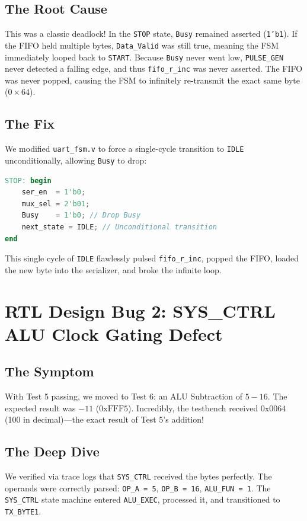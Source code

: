 \documentclass[11pt,a4paper]{article}
\begin{document}
\subsection{The Root Cause}
This was a classic deadlock! In the \texttt{STOP} state, \texttt{Busy} remained asserted (\texttt{1'b1}). If the FIFO held multiple bytes, \texttt{Data\_Valid} was still true, meaning the FSM immediately looped back to \texttt{START}. Because \texttt{Busy} never went low, \texttt{PULSE\_GEN} never detected a falling edge, and thus \texttt{fifo\_r\_inc} was never asserted. The FIFO was never popped, causing the FSM to infinitely re-transmit the exact same byte ($0\times64$).

\subsection{The Fix}
We modified \texttt{uart\_fsm.v} to force a single-cycle transition to \texttt{IDLE} unconditionally, allowing \texttt{Busy} to drop:
\begin{lstlisting}[language=Verilog]
STOP: begin
    ser_en  = 1'b0;
    mux_sel = 2'b01;
    Busy    = 1'b0; // Drop Busy
    next_state = IDLE; // Unconditional transition
end
\end{lstlisting}
This single cycle of \texttt{IDLE} flawlessly pulsed \texttt{fifo\_r\_inc}, popped the FIFO, loaded the new byte into the serializer, and broke the infinite loop.

\section{RTL Design Bug 2: SYS\_CTRL ALU Clock Gating Defect}

\subsection{The Symptom}
With Test 5 passing, we moved to Test 6: an ALU Subtraction of $5 - 16$. The expected result was $-11$ ($0\text{xFFF5}$). Incredibly, the testbench received $0\text{x0064}$ (100 in decimal)---the exact result of Test 5's addition!

\subsection{The Deep Dive}
We verified via trace logs that \texttt{SYS\_CTRL} received the bytes perfectly. The operands were correctly parsed: \texttt{OP\_A = 5}, \texttt{OP\_B = 16}, \texttt{ALU\_FUN = 1}. The \texttt{SYS\_CTRL} state machine entered \texttt{ALU\_EXEC}, processed it, and transitioned to \texttt{TX\_BYTE1}. 
\end{document}
